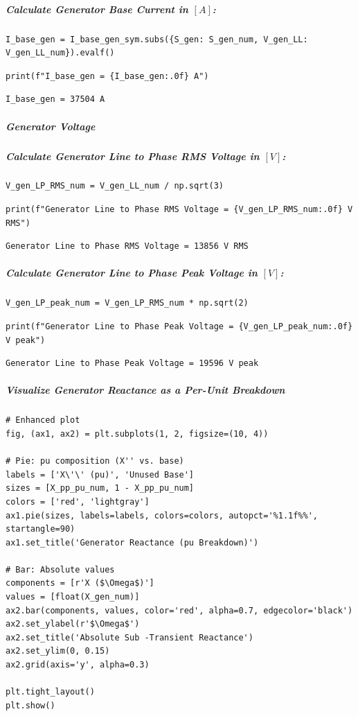 \subparagraph{Calculate Generator Base Current in $\left[A\right]$:}

\begin{verbatim}
I_base_gen = I_base_gen_sym.subs({S_gen: S_gen_num, V_gen_LL: V_gen_LL_num}).evalf()
\end{verbatim}

\begin{verbatim}
print(f"I_base_gen = {I_base_gen:.0f} A")
\end{verbatim}

\begin{verbatim}
I_base_gen = 37504 A
\end{verbatim}

\subparagraph{Generator Voltage}

\subparagraph{Calculate Generator Line to Phase RMS Voltage in $\left[V\right]$:}

\begin{verbatim}
V_gen_LP_RMS_num = V_gen_LL_num / np.sqrt(3)
\end{verbatim}

\begin{verbatim}
print(f"Generator Line to Phase RMS Voltage = {V_gen_LP_RMS_num:.0f} V RMS")
\end{verbatim}

\begin{verbatim}
Generator Line to Phase RMS Voltage = 13856 V RMS
\end{verbatim}

\subparagraph{Calculate Generator Line to Phase Peak Voltage in $\left[V\right]$:}

\begin{verbatim}
V_gen_LP_peak_num = V_gen_LP_RMS_num * np.sqrt(2)
\end{verbatim}

\begin{verbatim}
print(f"Generator Line to Phase Peak Voltage = {V_gen_LP_peak_num:.0f} V peak")
\end{verbatim}

\begin{verbatim}
Generator Line to Phase Peak Voltage = 19596 V peak
\end{verbatim}

\subparagraph{Visualize Generator Reactance as a Per-Unit Breakdown}

\begin{verbatim}
# Enhanced plot
fig, (ax1, ax2) = plt.subplots(1, 2, figsize=(10, 4))

# Pie: pu composition (X'' vs. base)
labels = ['X\'\' (pu)', 'Unused Base']
sizes = [X_pp_pu_num, 1 - X_pp_pu_num]
colors = ['red', 'lightgray']
ax1.pie(sizes, labels=labels, colors=colors, autopct='%1.1f%%', startangle=90)
ax1.set_title('Generator Reactance (pu Breakdown)')

# Bar: Absolute values
components = [r'X ($\Omega$)']
values = [float(X_gen_num)]
ax2.bar(components, values, color='red', alpha=0.7, edgecolor='black')
ax2.set_ylabel(r'$\Omega$')
ax2.set_title('Absolute Sub -Transient Reactance')
ax2.set_ylim(0, 0.15)
ax2.grid(axis='y', alpha=0.3)

plt.tight_layout()
plt.show()
\end{verbatim}

